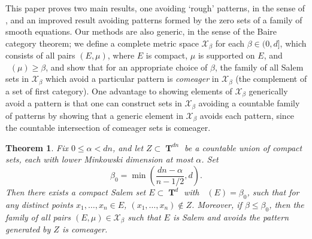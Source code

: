 \documentclass[dvipsnames,letterpaper,12pt]{article}
\numberwithin{equation}{section}
\DeclareMathOperator{\fordim}{\dim_{\mathbf{F}}}
\DeclareMathOperator{\TT}{\mathbf{T}}
\newtheorem{theorem}{Theorem}
\numberwithin{theorem}{section}
\begin{document}
This paper proves two main results, one avoiding `rough' patterns, in the sense of \cite{OurPaper}, and an improved result avoiding patterns formed by the zero sets of a family of smooth equations. Our methods are also generic, in the sense of the Baire category theorem; we define a complete metric space $\mathcal{X}_\beta$ for each $\beta \in (0,d]$, which consists of all pairs $(E,\mu)$, where $E$ is compact, $\mu$ is supported on $E$, and $\fordim(\mu) \geq \beta$, and show that for an appropriate choice of $\beta$, the family of all Salem sets in $\mathcal{X}_\beta$ which avoid a particular pattern is \emph{comeager} in $\mathcal{X}_\beta$ (the complement of a set of first category). One advantage to showing elements of $\mathcal{X}_\beta$ generically avoid a pattern is that one can construct sets in $\mathcal{X}_\beta$ avoiding a countable family of patterns by showing that a generic element in $\mathcal{X}_\beta$ avoids each pattern, since the countable intersection of comeager sets is comeager.

\begin{theorem} \label{maintheorem}
    Fix $0 \leq \alpha < dn$, and let $Z \subset \TT^{dn}$ be a countable union of compact sets, each with lower Minkowski dimension at most $\alpha$. Set
    \[ \beta_0 = \min \left( \frac{dn - \alpha}{n-1/2}, d \right). \]
    Then there exists a compact Salem set $E \subset \TT^d$ with $\fordim(E) = \beta_0$, such that for any distinct points $x_1, \dots, x_n \in E$, $(x_1, \dots, x_n) \not \in Z$. Moreover, if $\beta \leq \beta_0$, then the family of all pairs $(E,\mu) \in \mathcal{X}_\beta$ such that $E$ is Salem and avoids the pattern generated by $Z$ is comeager.
\end{theorem}
\end{document}
